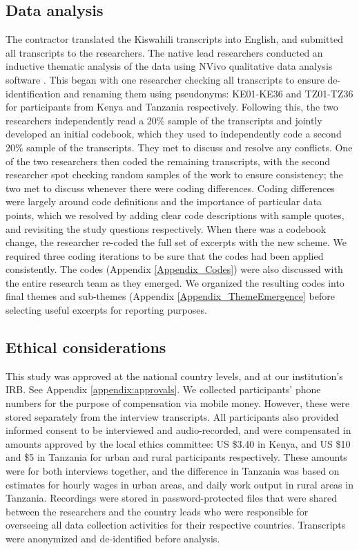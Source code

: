 \subsection{Data analysis}
The contractor translated the Kiswahili transcripts into English, and submitted all transcripts to the researchers. The native lead researchers conducted an inductive thematic analysis of the data using NVivo qualitative data analysis software \cite{braun2006using}. This began with one researcher checking all transcripts to ensure de-identification and renaming them using pseudonyms: KE01-KE36 and TZ01-TZ36 for participants from Kenya and Tanzania respectively. Following this, the two researchers independently read a 20\% sample of the transcripts and jointly developed an initial codebook, which they used to independently code a second  20\% sample of the transcripts. They met to discuss and resolve any conflicts. One of the two researchers then coded the remaining transcripts, with the second researcher spot checking random samples of the work to ensure consistency; the two met to discuss whenever there were coding differences. Coding differences were largely around code definitions and the importance of particular data points, which we resolved by adding clear code descriptions with sample quotes, and revisiting the study questions respectively. When there was a codebook change, the researcher re-coded the full set of excerpts with the new scheme. We required three coding iterations to be sure that the codes had been applied consistently. The codes (Appendix \ref{Appendix_Codes}) were also discussed with the entire  research team as they emerged. We organized the resulting codes into final themes and sub-themes  (Appendix \ref{Appendix_ThemeEmergence} before selecting useful excerpts for reporting purposes.  

\subsection{Ethical considerations}
This study was approved at the national country levels, and at our institution's IRB. See Appendix \ref{appendix:approvals}. We collected participants' phone numbers for the purpose of compensation via mobile money. However, these were stored separately from the interview transcripts. All participants also provided informed consent to be interviewed and audio-recorded, and were compensated in amounts approved by the local ethics committee: US \$3.40 in Kenya, and US \$10 and \$5 in Tanzania for urban and rural participants respectively. These amounts were for both interviews together, and the difference in Tanzania was based on estimates for hourly wages in urban areas, and daily work output in rural areas in Tanzania. Recordings were stored in password-protected files that were shared between the researchers and the country leads who were responsible for overseeing all data collection activities for their respective countries. Transcripts were anonymized and de-identified before analysis. 

